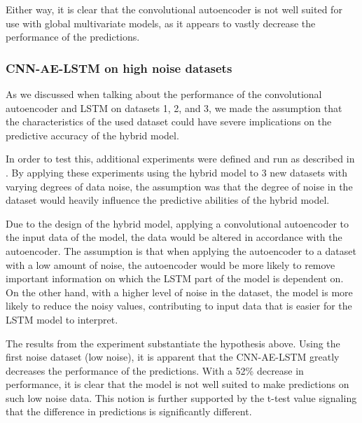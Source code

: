 Either way, it is clear that the convolutional autoencoder is not well suited for use with global multivariate models, as it appears to
vastly decrease the performance of the predictions.



\subsubsection{CNN-AE-LSTM on high noise datasets}

As we discussed when talking about the performance of the convolutional autoencoder and LSTM on datasets 1, 2, and 3,
we made the assumption that the characteristics of the used dataset could have severe implications on the predictive accuracy of the hybrid model.

In order to test this, additional experiments were defined and run as described in .
By applying these experiments using the hybrid model to 3 new datasets with varying degrees of data noise,
the assumption was that the degree of noise in the dataset would heavily influence the predictive abilities of the hybrid model.

Due to the design of the hybrid model, applying a convolutional autoencoder to the input data of the model,
the data would be altered in accordance with the autoencoder.
The assumption is that when applying the autoencoder to a dataset with a low amount of noise,
the autoencoder would be more likely to remove important information on which the LSTM part of the model is dependent on.
On the other hand, with a higher level of noise in the dataset,
the model is more likely to reduce the noisy values, contributing to input data that is easier for the LSTM model to interpret.


The results from the experiment substantiate the hypothesis above.
Using the first noise dataset (low noise), it is apparent that the CNN-AE-LSTM greatly decreases the performance of the predictions.
With a 52\% decrease in performance, it is clear that the model is not well suited to make predictions on such low noise data.
This notion is further supported by the t-test value signaling that the difference in predictions is significantly different.

